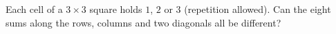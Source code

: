 Each cell of a $3\times3$ square holds $1$, $2$ or $3$ (repetition allowed). Can the eight sums along the rows, columns and two diagonals all be different?
